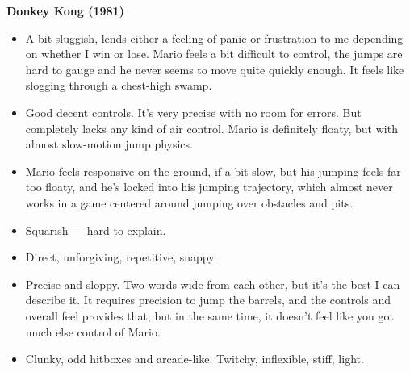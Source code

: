 \textbf{Donkey Kong (1981)}
\vspace{-5mm}
\begin{itemize}[noitemsep,nolistsep]
\item A bit sluggish, lends either a feeling of panic or frustration to me depending on whether I win or lose. Mario feels a bit difficult to control, the jumps are hard to gauge and he never seems to move quite quickly enough. It feels like slogging through a chest-high swamp.
\item Good decent controls. It's very precise with no room for errors. But completely lacks any kind of air control. Mario is definitely floaty, but with almost slow-motion jump physics.
\item Mario feels responsive on the ground, if a bit slow, but his jumping feels far too floaty, and he's locked into his jumping trajectory, which almost never works in a game centered around jumping over obstacles and pits.
\item Squarish --- hard to explain.
\item Direct, unforgiving, repetitive, snappy.
\item Precise and sloppy. Two words wide from each other, but it's the best I can describe it. It requires precision to jump the barrels, and the controls and overall feel provides that, but in the same time, it doesn't feel like you got much else control of Mario.
\item Clunky, odd hitboxes and arcade-like. Twitchy, inflexible, stiff, light.
\end{itemize}

